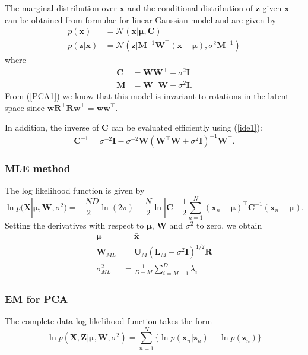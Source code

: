 \documentclass[a4paper]{report}
\renewcommand{\bf}{\mathbf}
\renewcommand{\cal}{\mathcal}
\newcommand{\bs}{\boldsymbol}
\begin{document}
The marginal distribution over $\bf{x}$ and the conditional distribution of $\bf{z}$ given $\bf{x}$ can be obtained from formulae for linear-Gaussian model and are given by
\begin{align}
	p(\bf{x}) &= \cal{N}(\bf{x}|\bs{\mu},\bf{C}) \\
	p(\bf{z|x}) &= \cal{N}(\bf{z}|\bf{M}^{-1}\bf{W}^{\intercal}(\bf{x}-\bs{\mu}),\sigma^2\bf{M}^{-1})
\end{align}
where
\begin{align}
	\bf{C} &= \bf{W}\bf{W}^{\intercal} + \sigma^2 \bf{I} \label{PCA1}\\
	\bf{M} &= \bf{W}^{\intercal} \bf{W} + \sigma^2 \bf{I}.
\end{align}
From (\ref{PCA1}) we know that this model is invariant to rotations in the latent space since $\bf{wR}^{\intercal}\bf{Rw}^{\intercal} = \bf{ww}^{\intercal}$.

In addition, the inverse of $\bf{C}$ can be evaluated efficiently using (\ref{ide1}):
\begin{equation}
	\bf{C}^{-1} = \sigma^{-2}\bf{I} - \sigma^{-2}\bf{W}(\bf{W}^{\intercal}\bf{W}+\sigma^2 \bf{I})^{-1} \bf{W}^{\intercal}.
\end{equation}
\subsubsection{MLE method}
The log likelihood function is given by
\begin{equation}
	\ln p(\bf{X}|\bs{\mu},\bf{W},\sigma^2) = \frac{-ND}{2}\ln(2\pi)-\frac{N}{2}\ln|\bf{C}|-\frac{1}{2}\sum_{n=1}^N (\bf{x}_n-\bs{\mu})^{\intercal} \bf{C}^{-1} (\bf{x}_n - \bs{\mu}).
\end{equation}
Setting the derivatives with respect to $\bs{\mu}$, $\bf{W}$ and $\sigma^2$ to zero, we obtain
\begin{align}
	\bf{\mu} &= \bar{\bf{x}} \\
	\bf{W}_{ML} &= \bf{U}_M (\bf{L}_M-\sigma^2 \bf{I})^{1/2}\bf{R} \\
	\sigma_{ML}^2 &= \frac{1}{D-M} \sum_{i=M+1}^D \lambda_i
\end{align}
\subsubsection{EM for PCA}
The complete-data log likelihood function takes the form
\begin{equation}
	\ln p(\bf{X,Z}|\bs{\mu},\bf{W},\sigma^2) = \sum_{n=1}^N \{ \ln p(\bf{x}_n|\bf{z}_n)+ \ln p(\bf{z}_n) \}
\end{equation}
\end{document}
